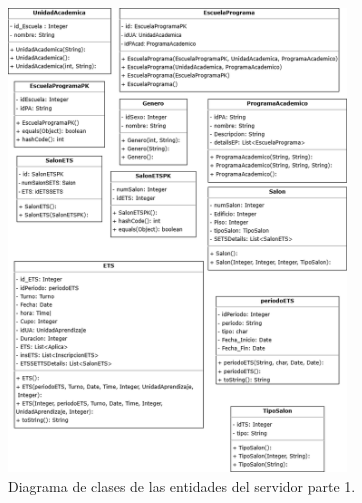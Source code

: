 \begin{figure}[htbp!]
	\begin{center}
		\includegraphics[width=0.8\textwidth]{Clases/EntidadesP1.png}
		\caption{Diagrama de clases de las entidades del servidor parte 1.}
		\label{fig:DE1}
	\end{center}
\end{figure}
\newpage

